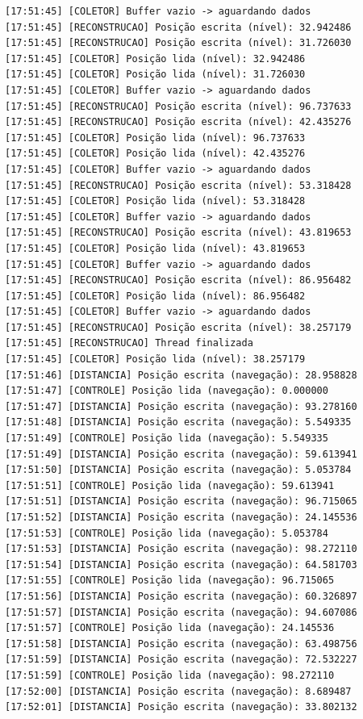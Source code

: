 \documentclass[12pt]{article}
\begin{document}
\begin{verbatim}
[17:51:45] [COLETOR] Buffer vazio -> aguardando dados
[17:51:45] [RECONSTRUCAO] Posição escrita (nível): 32.942486
[17:51:45] [RECONSTRUCAO] Posição escrita (nível): 31.726030
[17:51:45] [COLETOR] Posição lida (nível): 32.942486
[17:51:45] [COLETOR] Posição lida (nível): 31.726030
[17:51:45] [COLETOR] Buffer vazio -> aguardando dados
[17:51:45] [RECONSTRUCAO] Posição escrita (nível): 96.737633
[17:51:45] [RECONSTRUCAO] Posição escrita (nível): 42.435276
[17:51:45] [COLETOR] Posição lida (nível): 96.737633
[17:51:45] [COLETOR] Posição lida (nível): 42.435276
[17:51:45] [COLETOR] Buffer vazio -> aguardando dados
[17:51:45] [RECONSTRUCAO] Posição escrita (nível): 53.318428
[17:51:45] [COLETOR] Posição lida (nível): 53.318428
[17:51:45] [COLETOR] Buffer vazio -> aguardando dados
[17:51:45] [RECONSTRUCAO] Posição escrita (nível): 43.819653
[17:51:45] [COLETOR] Posição lida (nível): 43.819653
[17:51:45] [COLETOR] Buffer vazio -> aguardando dados
[17:51:45] [RECONSTRUCAO] Posição escrita (nível): 86.956482
[17:51:45] [COLETOR] Posição lida (nível): 86.956482
[17:51:45] [COLETOR] Buffer vazio -> aguardando dados
[17:51:45] [RECONSTRUCAO] Posição escrita (nível): 38.257179
[17:51:45] [RECONSTRUCAO] Thread finalizada
[17:51:45] [COLETOR] Posição lida (nível): 38.257179
[17:51:46] [DISTANCIA] Posição escrita (navegação): 28.958828
[17:51:47] [CONTROLE] Posição lida (navegação): 0.000000
[17:51:47] [DISTANCIA] Posição escrita (navegação): 93.278160
[17:51:48] [DISTANCIA] Posição escrita (navegação): 5.549335
[17:51:49] [CONTROLE] Posição lida (navegação): 5.549335
[17:51:49] [DISTANCIA] Posição escrita (navegação): 59.613941
[17:51:50] [DISTANCIA] Posição escrita (navegação): 5.053784
[17:51:51] [CONTROLE] Posição lida (navegação): 59.613941
[17:51:51] [DISTANCIA] Posição escrita (navegação): 96.715065
[17:51:52] [DISTANCIA] Posição escrita (navegação): 24.145536
[17:51:53] [CONTROLE] Posição lida (navegação): 5.053784
[17:51:53] [DISTANCIA] Posição escrita (navegação): 98.272110
[17:51:54] [DISTANCIA] Posição escrita (navegação): 64.581703
[17:51:55] [CONTROLE] Posição lida (navegação): 96.715065
[17:51:56] [DISTANCIA] Posição escrita (navegação): 60.326897
[17:51:57] [DISTANCIA] Posição escrita (navegação): 94.607086
[17:51:57] [CONTROLE] Posição lida (navegação): 24.145536
[17:51:58] [DISTANCIA] Posição escrita (navegação): 63.498756
[17:51:59] [DISTANCIA] Posição escrita (navegação): 72.532227
[17:51:59] [CONTROLE] Posição lida (navegação): 98.272110
[17:52:00] [DISTANCIA] Posição escrita (navegação): 8.689487
[17:52:01] [DISTANCIA] Posição escrita (navegação): 33.802132

\end{verbatim}
\end{document}
